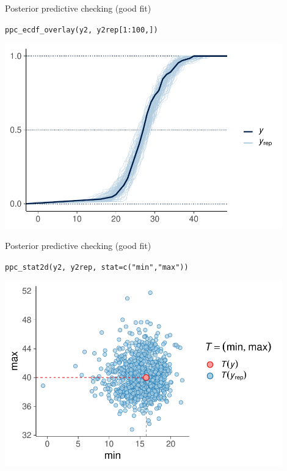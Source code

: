\documentclass[t]{beamer}
\begin{document}
\begin{frame}{Posterior predictive checking (good fit)}

  \vspace{-1\baselineskip}
  \texttt{ppc\_ecdf\_overlay(y2, y2rep[1:100,])}
  
  \includegraphics[height=8cm]{Newcomb_ppc_ecdf_overlay_nooutliers.pdf}

\end{frame}

\begin{frame}{Posterior predictive checking (good fit)}

  \vspace{-1\baselineskip}
  \texttt{ppc\_stat2d(y2, y2rep, stat=c("min","max"))}
  
  \includegraphics[height=8cm]{Newcomb_ppc_stat2d_minmax_nooutliers.pdf}

\end{frame}

\end{document}
